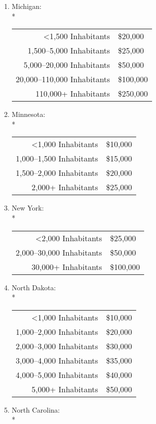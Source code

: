 ﻿\documentclass[12pt]{report}
\begin{document}
\begin{enumerate}
        \item Michigan:\\*
            \begin{tabular}{r|l}
                <1,500 Inhabitants & \$20,000\\
                1,500--5,000 Inhabitants & \$25,000\\
                5,000--20,000 Inhabitants & \$50,000\\
                20,000--110,000 Inhabitants & \$100,000\\
                110,000+ Inhabitants & \$250,000
            \end{tabular}
        \item Minnesota:\\*
            \begin{tabular}{r|l}
                <1,000 Inhabitants & \$10,000\\
                1,000--1,500 Inhabitants & \$15,000\\
                1,500--2,000 Inhabitants & \$20,000\\
                2,000+ Inhabitants & \$25,000
            \end{tabular}
        \item New York:\\*
            \begin{tabular}{r|l}
                <2,000 Inhabitants & \$25,000\\
                2,000--30,000 Inhabitants & \$50,000\\
                30,000+ Inhabitants & \$100,000
            \end{tabular}
        \item North Dakota:\\*
            \begin{tabular}{r|l}
                <1,000 Inhabitants & \$10,000\\
                1,000--2,000 Inhabitants & \$20,000\\
                2,000--3,000 Inhabitants & \$30,000\\
                3,000--4,000 Inhabitants & \$35,000\\
                4,000--5,000 Inhabitants & \$40,000\\
                5,000+ Inhabitants & \$50,000
            \end{tabular}
        \item North Carolina:\\*
            \begin{tabular}{r|l}

\end{tabular}
\end{enumerate}
\end{document}
